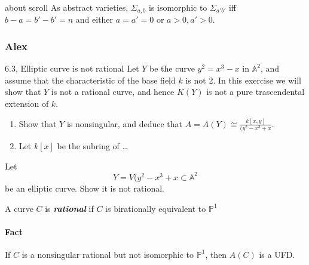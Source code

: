\begin{manualexercise}{about scroll}
	As abstract varieties, $\Sigma_{a,b}$ is isomorphic to $\Sigma_{a'b'}$ iff $b-a=b'-b'=n$ and either  $a=a'=0$ or  $a>0, a'>0$.
\end{manualexercise}

\subsubsection{Alex}
\begin{manualexercise}{6.3, Elliptic curve is not rational}
	Let  $Y$ be the curve $y^2=x^3-x$ in $\mathbb{A}^2$, and assume that the characteristic of the base field $k$ is not 2. In this exercise we will show that $Y$ is not a rational curve, and hence $K(Y)$ is not a pure trascendental extension of $k$.
\begin{enumerate}[label=\alph*.]
	\item Show that $Y$ is nonsingular, and deduce that $A=A(Y)\cong \frac{k[x,y]}{(y^2-x^3+x}$.
	\item Let $k[x]$ be the subring of …
\end{enumerate}
\end{manualexercise}

\begin{manualexercise}{6.2}
Let
	\[Y=V(y^2-x^3+x\subset \mathbb{A}^2\]
	be an elliptic curve. Show it is not rational.
\end{manualexercise}

\begin{defn}
	A curve $C$ is \textit{\textbf{rational}} if $C$ is birationally equivalent to $\mathbb{P}^1$
\end{defn}

\paragraph{Fact} If $C$ is a nonsingular rational but not isomorphic to $\mathbb{P}^1$, then $A(C)$ is a UFD.

